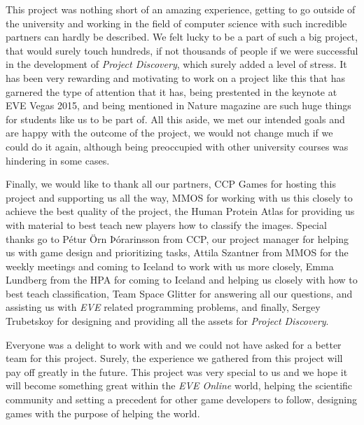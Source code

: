 This project was nothing short of an amazing experience, getting to go outside of the university and working in the field of computer science with such incredible partners can hardly be described. We felt lucky to be a part of such a big project, that would surely touch hundreds, if not thousands of people if we were successful in the development of \emph{Project Discovery}, which surely added a level of stress. It has been very rewarding and motivating to work on a project like this that has garnered the type of attention that it has, being prestented in the keynote at EVE Vegas 2015, and being mentioned in Nature magazine are such huge things for students like us to be part of. All this aside, we met our intended goals and are happy with the outcome of the project, we would not change much if we could do it again, although being preoccupied with other university courses was hindering in some cases.

Finally, we would like to thank all our partners, CCP Games for hosting this project and supporting us all the way, MMOS for working with us this closely to achieve the best quality of the project, the Human Protein Atlas for providing us with material to best teach new players how to classify the images. Special thanks go to Pétur Örn Þórarinsson from CCP, our project manager for helping us with game design and prioritizing tasks, Attila Szantner from MMOS for the weekly meetings and coming to Iceland to work with us more closely, Emma Lundberg from the HPA for coming to Iceland and helping us closely with how to best teach classification, Team Space Glitter for answering all our questions, and assisting us with \emph{EVE} related programming problems, and finally, Sergey Trubetskoy for designing and providing all the assets for \emph{Project Discovery}.

Everyone was a delight to work with and we could not have asked for a better team for this project. Surely, the experience we gathered from this project will pay off greatly in the future. This project was very special to us and we hope it will become something great within the \emph{EVE Online} world, helping the scientific community and setting a precedent for other game developers to follow, designing games with the purpose of helping the world.